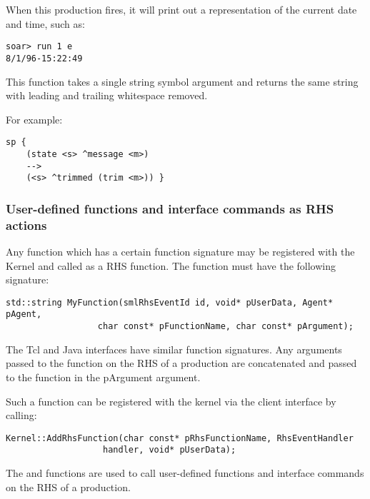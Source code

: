 \begin{description}
When this production fires, it will print out a representation of the
current date and time, such as:
\begin{verbatim}
soar> run 1 e
8/1/96-15:22:49
\end{verbatim}


\item [\soarb{trim} --- ] This function takes a single string symbol argument
and returns the same string with leading and trailing whitespace removed.

For example:

\begin{verbatim}
sp {
    (state <s> ^message <m>)
    -->
    (<s> ^trimmed (trim <m>)) }
\end{verbatim}

\end{description}

\subsubsection{User-defined functions and interface commands as RHS actions}

Any function which has a certain function signature may be registered with the
Kernel and called as a RHS function.  The function must have the following signature:

\begin{verbatim}
std::string MyFunction(smlRhsEventId id, void* pUserData, Agent* pAgent,
                  char const* pFunctionName, char const* pArgument);
\end{verbatim}

The Tcl and Java interfaces have similar function signatures. Any arguments passed
to the function on the RHS of a production are concatenated and passed to the function
in the pArgument argument.

Such a function can be registered with the kernel via the client interface by calling:

\begin{verbatim}
Kernel::AddRhsFunction(char const* pRhsFunctionName, RhsEventHandler 
                   handler, void* pUserData);
\end{verbatim}

The  and  functions are used to call user-defined functions and interface
commands on the RHS of a production.

